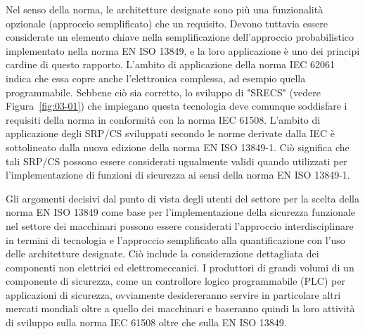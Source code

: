 Nel senso della norma, le architetture designate sono più una funzionalità opzionale (approccio semplificato) che un requisito. Devono tuttavia essere considerate un elemento chiave nella semplificazione dell'approccio probabilistico implementato nella norma EN ISO 13849, e la loro applicazione è uno dei principi cardine di questo rapporto. L'ambito di applicazione della norma IEC 62061 indica che essa copre anche l'elettronica complessa, ad esempio quella programmabile. Sebbene ciò sia corretto, lo sviluppo di "SRECS" (vedere Figura~\ref{fig:03-01}) che impiegano questa tecnologia deve comunque soddisfare i requisiti della norma in conformità con la norma IEC 61508. L'ambito di applicazione degli SRP/CS sviluppati secondo le norme derivate dalla IEC è sottolineato dalla nuova edizione della norma EN ISO 13849-1. Ciò significa che tali SRP/CS possono essere considerati ugualmente validi quando utilizzati per l'implementazione di funzioni di sicurezza ai sensi della norma EN ISO 13849-1.

Gli argomenti decisivi dal punto di vista degli utenti del settore per la scelta della norma EN ISO 13849 come base per l'implementazione della sicurezza funzionale nel settore dei macchinari possono essere considerati l'approccio interdisciplinare in termini di tecnologia e l'approccio semplificato alla quantificazione con l'uso delle architetture designate. Ciò include la considerazione dettagliata dei componenti non elettrici ed elettromeccanici. I produttori di grandi volumi di un componente di sicurezza, come un controllore logico programmabile (PLC) per applicazioni di sicurezza, ovviamente desidereranno servire in particolare altri mercati mondiali oltre a quello dei macchinari e baseranno quindi la loro attività di sviluppo sulla norma IEC 61508 oltre che sulla EN ISO 13849.

